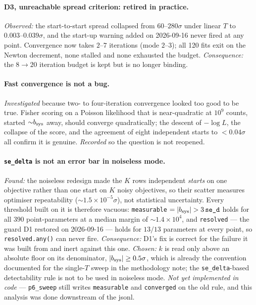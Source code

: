 \documentclass[11pt]{article}
\begin{document}
\paragraph{D3, unreachable spread criterion: retired in practice.}
\emph{Observed:} the start-to-start spread collapsed from $60$--$280\sigma$
under linear $T$ to $0.003$--$0.039\sigma$, and the start-up warning added on
2026-09-16 never fired at any point. Convergence now takes $2$--$7$ iterations
(mode $2$--$3$); all 120 fits exit on the Newton decrement, none stalled and
none exhausted the budget. \emph{Consequence:} the $8\to20$ iteration budget is
kept but is no longer binding.

\paragraph{Fast convergence is not a bug.} \emph{Investigated} because two- to
four-iteration convergence looked too good to be true. Fisher scoring on a
Poisson likelihood that is near-quadratic at $10^9$ counts, started
${\sim}b_{\rm sys}$ away, should converge quadratically; the descent of
$-\log L$, the collapse of the score, and the agreement of eight independent
starts to $<0.04\sigma$ all confirm it is genuine. \emph{Recorded} so the
question is not reopened.

\paragraph{\texttt{se\_delta} is not an error bar in noiseless mode.}
\emph{Found:} the noiseless redesign made the $K$ rows independent \emph{starts}
on one objective rather than one start on $K$ noisy objectives, so their scatter
measures optimiser repeatability (${\sim}1.5\times10^{-5}\sigma$), not
statistical uncertainty. Every threshold built on it is therefore vacuous:
\texttt{measurable} $=|b_{\rm sys}|>3\,\texttt{se\_d}$ holds for all $390$
point-parameters at a median margin of ${\sim}1.4\times10^{4}$, and
\texttt{resolved} --- the guard D1 restored on 2026-09-16 --- holds for $13/13$
parameters at every point, so \texttt{resolved.any()} can never fire.
\emph{Consequence:} D1's fix is correct for the failure it was built from and
inert against this one. \emph{Chosen:} $k$ is read only above an absolute floor
on its denominator, $|b_{\rm sys}|\ge0.5\sigma$, which is already the convention
documented for the single-$T$ sweep in the methodology note; the
\texttt{se\_delta}-based detectability rule is not to be used in noiseless mode.
\emph{Not yet implemented in code} --- \texttt{p6\_sweep} still writes
\texttt{measurable} and \texttt{converged} on the old rule, and this analysis
was done downstream of the jsonl.
\end{document}
